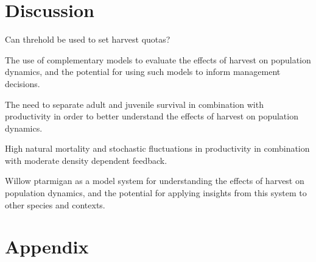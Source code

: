 \documentclass[12pt,a4paper,final,abstract=true,headings=small]{scrartcl}
\begin{document}


\section*{Discussion}

Can threhold be used to set harvest quotas?

The use of complementary models to evaluate the effects of harvest on population dynamics, and the potential for using such models to inform management decisions.

The need to separate adult and juvenile survival in combination with productivity in order to better understand the effects of harvest on population dynamics.

High natural mortality and stochastic fluctuations in productivity in combination with moderate density dependent feedback.

Willow ptarmigan as a model system for understanding the effects of harvest on population dynamics, and the potential for applying insights from this system to other species and contexts.

\section{Appendix}


\end{document}
